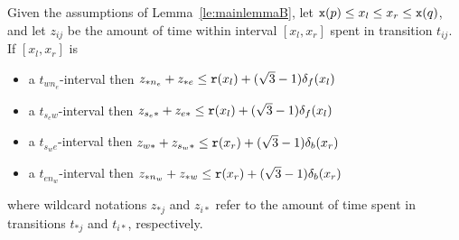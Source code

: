 \begin{lemma}
\label{lem:gentlepath}
Given the assumptions of Lemma~\ref{le:mainlemmaB},
let ${\tt x}(p) \leq x_l \leq x_r \leq {\tt x}(q)$,
and let $z_{ij}$ be the amount of time within interval $[x_l,x_r]$ spent
in transition $t_{ij}$. If $[x_l,x_r]$ is
%
%
\begin{itemize}
\item a $t_{wn_e}$-interval then
$z_{\ast n_e} + z_{\ast e} \leq {\tt r}(x_l) + (\sqrt{3} - 1)\delta_f(x_l)$
\item a $t_{s_ew}$-interval then
$z_{s_e \ast} + z_{e \ast} \leq {\tt r}(x_l) + (\sqrt{3} - 1)\delta_f(x_l)$
\item a $t_{s_we}$-interval then
$z_{w \ast} + z_{s_w \ast} \leq {\tt r}(x_r) + (\sqrt{3} - 1)\delta_b(x_r)$
\item a $t_{en_w}$-interval then
$z_{\ast n_w} + z_{\ast w} \leq {\tt r}(x_r) + (\sqrt{3} - 1)\delta_b(x_r)$
\end{itemize}
%
where wildcard notations $z_{\ast j}$ and $z_{i \ast}$ refer to the amount
of time spent in transitions $t_{\ast j}$ and $t_{i \ast}$, respectively.
\end{lemma}

